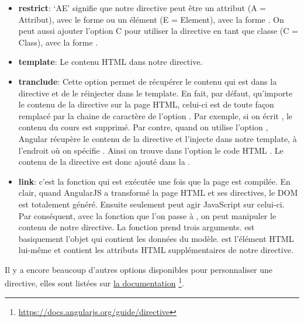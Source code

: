 \documentclass[letterpaper,10pt,oneside]{sphinxmanual}
\begin{document}
\begin{itemize}
\item {} 
\textbf{restrict}: `AE' signifie que notre directive peut être un attribut (A = Attribut), avec le forme  ou un élément (E = Element), avec la forme . On peut aussi ajouter l'option C pour utiliser la directive en tant que classe (C = Class), avec la forme .

\item {} 
\textbf{template}: Le contenu HTML dans notre directive.

\item {} 
\textbf{tranclude}: Cette option permet de récupérer le contenu qui est dans la directive et de le réinjecter dans le template. En fait, par défaut, qu'importe le contenu de la directive sur la page HTML, celui-ci est de toute façon remplacé par la chaine de caractère de l'option . Par exemple, si on écrit , le contenu du cours est supprimé. Par contre, quand on utilise l'option , Angular récupère le contenu de la directive et l'injecte dans notre template, à l'endroit où on spécifie . Ainsi on trouve dans l'option  le code HTML . Le contenu de la directive est donc ajouté dans la .

\item {} 
\textbf{link}: c'est la fonction qui est exécutée une fois que la page est compilée. En clair, quand AngularJS a transformé la page HTML et ses directives, le DOM est totalement généré. Ensuite seulement peut agir JavaScript sur celui-ci. Par conséquent, avec la fonction que l'on passe à , on peut manipuler le contenu de notre directive. La fonction prend trois arguments.  est basiquement l'objet qui contient les données du modèle.  est l'élément HTML lui-même et  contient les attributs HTML supplémentaires de notre directive.

\end{itemize}

Il y a encore beaucoup d'autres options disponibles pour personnaliser une directive, elles sont listées sur \href{https://docs.angularjs.org/guide/directive}{la documentation} \footnote{
\href{https://docs.angularjs.org/guide/directive}{https://docs.angularjs.org/guide/directive}
}.
\end{document}
